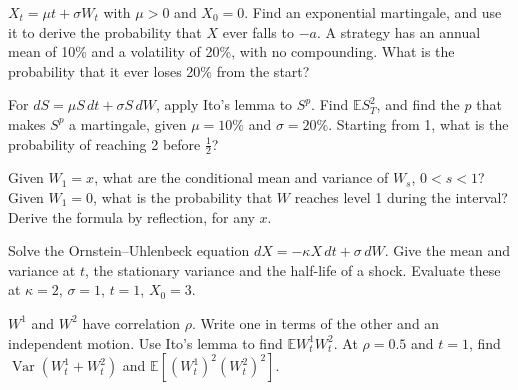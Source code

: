 \begin{question}\label{iq:iv1:stochastic-calculus:12}
$X_t = \mu t + \sigma W_t$ with $\mu > 0$ and $X_0 = 0$. Find an exponential martingale, and use it to derive the probability that $X$ ever falls to $-a$. A strategy has an annual mean of 10\% and a volatility of 20\%, with no compounding. What is the probability that it ever loses 20\% from the start?
\end{question}

\begin{question}\label{iq:iv1:stochastic-calculus:13}
For $dS = \mu S\,dt + \sigma S\,dW$, apply Ito's lemma to $S^p$. Find $\mathbb{E}S_T^2$, and find the $p$ that makes $S^p$ a martingale, given $\mu = 10\%$ and $\sigma = 20\%$. Starting from 1, what is the probability of reaching 2 before $\frac12$?
\end{question}

\begin{question}\label{iq:iv1:stochastic-calculus:14}
Given $W_1 = x$, what are the conditional mean and variance of $W_s$, $0 < s < 1$? Given $W_1 = 0$, what is the probability that $W$ reaches level 1 during the interval? Derive the formula by reflection, for any $x$.
\end{question}

\begin{question}\label{iq:iv1:stochastic-calculus:15}
Solve the Ornstein--Uhlenbeck equation $dX = -\kappa X\,dt + \sigma\,dW$. Give the mean and variance at $t$, the stationary variance and the half-life of a shock. Evaluate these at $\kappa = 2$, $\sigma = 1$, $t = 1$, $X_0 = 3$.
\end{question}

\begin{question}\label{iq:iv1:stochastic-calculus:16}
$W^1$ and $W^2$ have correlation $\rho$. Write one in terms of the other and an independent motion. Use Ito's lemma to find $\mathbb{E}W^1_tW^2_t$. At $\rho = 0.5$ and $t = 1$, find $\operatorname{Var}(W^1_t + W^2_t)$ and $\mathbb{E}[(W^1_t)^2(W^2_t)^2]$.
\end{question}

